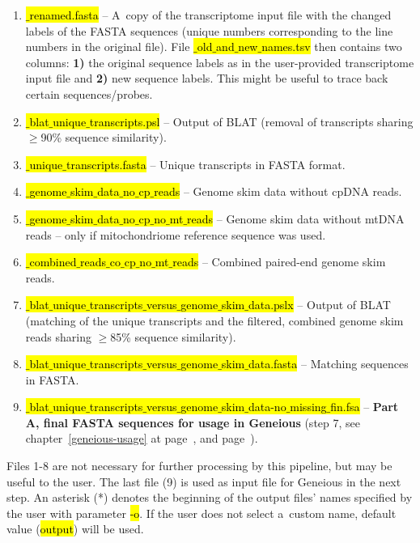 \documentclass[a4paper, 11pt, twoside]{article}
\renewcommand{\texttt}[1]{\hl{\ttfamily #1}}
\begin{document}
\begin{enumerate}
  \item \texttt{*$\_$renamed.fasta} -- A~copy of the transcriptome input file with the changed labels of the FASTA sequences (unique numbers corresponding to the line numbers in the original file). File \texttt{*$\_$old$\_$and$\_$new$\_$names.tsv} then contains two columns: \textbf{1)} the original sequence labels as in the user-provided transcriptome input file and \textbf{2)} new sequence labels. This might be useful to trace back certain sequences/probes.
  \item \texttt{*$\_$blat$\_$unique$\_$transcripts.psl} -- Output of BLAT (removal of transcripts sharing $\geq$90\% sequence similarity).
  \item \texttt{*$\_$unique$\_$transcripts.fasta} -- Unique transcripts in FASTA format.
  \item \texttt{*$\_$genome$\_$skim$\_$data$\_$no$\_$cp$\_$reads} -- Genome skim data without cpDNA reads.
  \item \texttt{*$\_$genome$\_$skim$\_$data$\_$no$\_$cp$\_$no$\_$mt$\_$reads} -- Genome skim data without mtDNA reads -- only if mitochondriome reference sequence was used.
  \item \texttt{*$\_$combined$\_$reads$\_$co$\_$cp$\_$no$\_$mt$\_$reads} -- Combined paired-end genome skim reads.
  \item \texttt{*$\_$blat$\_$unique$\_$transcripts$\_$versus$\_$genome$\_$skim$\_$data.pslx} -- Output of BLAT (ma\-tching of the unique transcripts and the filtered, combined genome skim reads sharing $\geq$85\% sequence similarity).
  \item \texttt{*$\_$blat$\_$unique$\_$transcripts$\_$versus$\_$genome$\_$skim$\_$data.fasta} -- Matching sequences in FASTA.
  \item \texttt{*$\_$blat$\_$unique$\_$transcripts$\_$versus$\_$genome$\_$skim$\_$data-no$\_$missing$\_$fin.fsa} -- \textbf{Part A, final FASTA sequences for usage in Geneious} (step 7, see chapter~\ref{geneious-usage} at page~\pageref{geneious-usage}, and page~\pageref{pipeline-overview}).
\end{enumerate}

Files 1-8 are not necessary for further processing by this pipeline, but may be useful to the user. The last file (9) is used as input file for Geneious in the next step. An asterisk (*) denotes the beginning of the output files' names specified by the user with parameter \texttt{-o}. If the user does not select a~custom name, default value (\texttt{output}) will be used.
\end{document}
